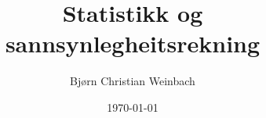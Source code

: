\documentclass[10pt, a4paper, nynorsk]{report}          %
\title{Statistikk og sannsynlegheitsrekning} %
\author{Bjørn Christian Weinbach}                   %
\date{\today}                                       %
\begin{document}
    
\maketitle                                          %

\begin{abstract}                                    %
\end{abstract}

\tableofcontents






\end{document}
